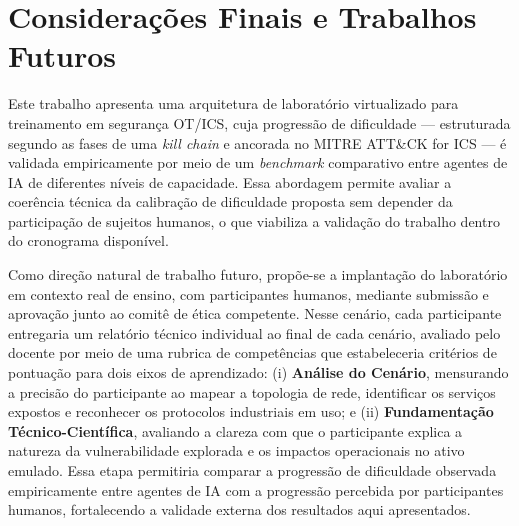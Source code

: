 \documentclass[conference]{IEEEtran}
\begin{document}
\section{Considerações Finais e Trabalhos Futuros}
\label{sec:trabalhos_futuros}

Este trabalho apresenta uma arquitetura de laboratório virtualizado para treinamento em segurança OT/ICS, cuja progressão de dificuldade --- estruturada segundo as fases de uma \textit{kill chain} e ancorada no MITRE ATT\&CK for ICS --- é validada empiricamente por meio de um \textit{benchmark} comparativo entre agentes de IA de diferentes níveis de capacidade. Essa abordagem permite avaliar a coerência técnica da calibração de dificuldade proposta sem depender da participação de sujeitos humanos, o que viabiliza a validação do trabalho dentro do cronograma disponível.

Como direção natural de trabalho futuro, propõe-se a implantação do laboratório em contexto real de ensino, com participantes humanos, mediante submissão e aprovação junto ao comitê de ética competente. Nesse cenário, cada participante entregaria um relatório técnico individual ao final de cada cenário, avaliado pelo docente por meio de uma rubrica de competências que estabeleceria critérios de pontuação para dois eixos de aprendizado: (i) \textbf{Análise do Cenário}, mensurando a precisão do participante ao mapear a topologia de rede, identificar os serviços expostos e reconhecer os protocolos industriais em uso; e (ii) \textbf{Fundamentação Técnico-Científica}, avaliando a clareza com que o participante explica a natureza da vulnerabilidade explorada e os impactos operacionais no ativo emulado. Essa etapa permitiria comparar a progressão de dificuldade observada empiricamente entre agentes de IA com a progressão percebida por participantes humanos, fortalecendo a validade externa dos resultados aqui apresentados.


 
\end{document}
